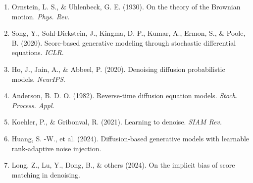 \documentclass[11pt,a4paper]{article}
\begin{document}
\begin{enumerate}
  \item Ornstein, L. S., \& Uhlenbeck, G. E. (1930). On the theory of the Brownian motion. \textit{Phys. Rev.}
  \item Song, Y., Sohl-Dickstein, J., Kingma, D. P., Kumar, A., Ermon, S., \& Poole, B. (2020). Score-based generative modeling through stochastic differential equations. \textit{ICLR}.
  \item Ho, J., Jain, A., \& Abbeel, P. (2020). Denoising diffusion probabilistic models. \textit{NeurIPS}.
  \item Anderson, B. D. O. (1982). Reverse-time diffusion equation models. \textit{Stoch. Process. Appl.}
  \item Koehler, P., \& Gribonval, R. (2021). Learning to denoise. \textit{SIAM Rev.}
  \item Huang, S. -W., et al. (2024). Diffusion-based generative models with learnable rank-adaptive noise injection.
  \item Long, Z., Lu, Y., Dong, B., \& others (2024). On the implicit bias of score matching in denoising.
\end{enumerate}
\end{document}
